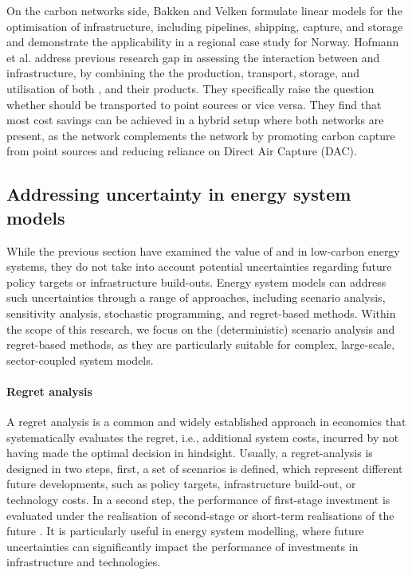 \documentclass[preprint,12pt,sort&compress]{elsarticle}
\begin{document}
On the carbon networks side, Bakken and Velken \cite{bakkenLinearModelsOptimization2008} formulate linear models for the optimisation of  infrastructure, including pipelines, shipping,  capture, and storage and demonstrate the applicability in a regional case study for Norway.
Hofmann et al. \cite{hofmannH2CO2Network2025} address previous research gap in assessing the interaction between  and  infrastructure, by combining the the production, transport, storage, and utilisation of both ,  and their products. They specifically raise the question whether  should be transported to  point sources or vice versa. They find that most cost savings can be achieved in a hybrid setup where both networks are present, as the  network complements the  network by promoting carbon capture from point sources and reducing reliance on Direct Air Capture (DAC).
 
\subsection{Addressing uncertainty in energy system models}
While the previous section have examined the value of  and  in low-carbon energy systems, they do not take into account potential uncertainties regarding future policy targets or infrastructure build-outs. 
Energy system models can address such uncertainties through a range of approaches, including scenario analysis, sensitivity analysis, stochastic programming, and regret-based methods. Within the scope of this research, we focus on the (deterministic) scenario analysis and regret-based methods, as they are particularly suitable for complex, large-scale, sector-coupled system models.

\paragraph{Regret analysis}
A regret analysis is a common and widely established approach in economics that systematically evaluates the regret, i.e., additional system costs, incurred by not having made the optimal decision in hindsight. Usually, a regret-analysis is designed in two steps, first, a set of scenarios is defined, which represent different future developments, such as policy targets, infrastructure build-out, or technology costs. In a second step, the performance of first-stage investment is evaluated under the realisation of second-stage or short-term realisations of the future \cite{salvatoreManagerialEconomicPrinciples2008}. It is particularly useful in energy system modelling, where future uncertainties can significantly impact the performance of investments in infrastructure and technologies.
\end{document}
